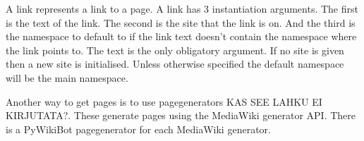A link represents a link to a page. A link has 3 instantiation arguments. The first is the text of the link. The second is the site that the link is on. And the third is the namespace to default to if the link text doesn't contain the namespace where the link points to. The text is the only obligatory argument. If no site is given then a new site is initialised. Unless otherwise specified the default namespace will be the main namespace.

Another way to get pages is to use pagegenerators KAS SEE LAHKU EI KIRJUTATA?. These generate pages using the MediaWiki generator API. There is a PyWikiBot pagegenerator for each MediaWiki generator.
